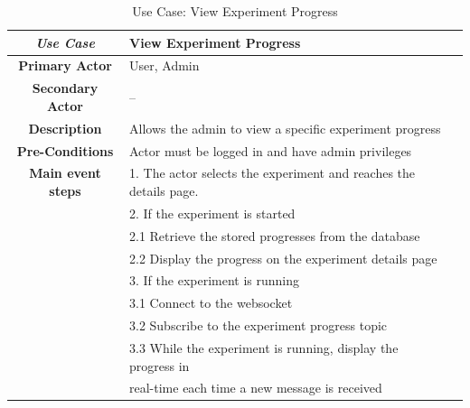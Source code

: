 \begin{table}[ht!]
    \centering
    \caption{Use Case: View Experiment Progress}
    \begin{tabularx}{\textwidth}{|Sl|S{X}|}
        \hline
        \textbf{\textit{Use Case}}       & \textbf{View Experiment Progress}                                                     \\ \hline
        \textbf{Primary Actor}           & User, Admin                                                        \\ \hline
        \textbf{Secondary Actor}         & --                                                                          \\ \hline
        \textbf{Description}             & Allows the admin to view a specific experiment progress                            \\ \hline
        \textbf{Pre-Conditions}          & Actor must be logged in and have admin privileges                           \\ \hline
        \textbf{Main event steps}        & 1. The actor selects the experiment and reaches the details page.               \\
                                        & 2. If the experiment is started                                        \\
                                        & \hspace{1em} 2.1 Retrieve the stored progresses from the database \\
                                        & \hspace{1em} 2.2 Display the progress on the experiment details page\\
                                        & 3. If the experiment is running                    \\
                                        & \hspace{1em} 3.1 Connect to the websocket\\
                                        & \hspace{1em} 3.2 Subscribe to the experiment progress topic\\
                                        & \hspace{1em} 3.3 While the experiment is running, display the progress in  \\
                                        & \hspace{1em} real-time each time a new message is received\\

\end{tabularx}
\end{table}
